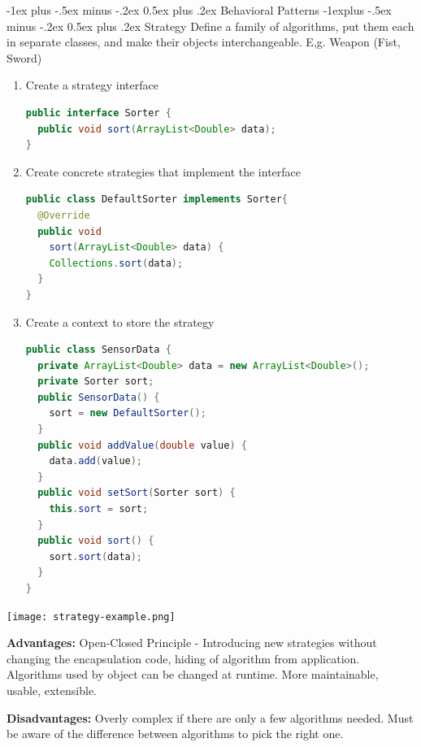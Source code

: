 \documentclass[letterpaper, 8pt]{extarticle}
\makeatletter
\renewcommand{\section}{\@startsection{section}{1}{0mm}%
                                {-1ex plus -.5ex minus -.2ex}%
                                {0.5ex plus .2ex}%
                                {\normalfont\normalsize\bfseries}}
\renewcommand{\subsection}{\@startsection{subsection}{2}{0mm}%
                                {-1explus -.5ex minus -.2ex}%
                                {0.5ex plus .2ex}%
                                {\normalfont\small\bfseries}}
\makeatother
\begin{document}
\begin{multicols*}{5}
  \section{Behavioral Patterns}
  \subsection{Strategy}
  Define a family of algorithms, put them each in separate classes,
  and make their objects interchangeable. E,g. Weapon (Fist, Sword)
  \begin{enumerate}
    \item Create a strategy interface
          \begin{lstlisting}[language=Java, breaklines=true]
public interface Sorter {
  public void sort(ArrayList<Double> data);
}
        \end{lstlisting}
    \item Create concrete strategies that implement the interface
          \begin{lstlisting}[language=Java, breaklines=true]
public class DefaultSorter implements Sorter{
  @Override
  public void
    sort(ArrayList<Double> data) {
    Collections.sort(data);
  }
}
        \end{lstlisting}
    \item Create a context to store the strategy
          \begin{lstlisting}[language=Java, breaklines=true]
public class SensorData {
  private ArrayList<Double> data = new ArrayList<Double>();
  private Sorter sort;
  public SensorData() {
    sort = new DefaultSorter();
  }
  public void addValue(double value) {
    data.add(value);
  }
  public void setSort(Sorter sort) {
    this.sort = sort;
  }
  public void sort() {
    sort.sort(data);
  }
}

        \end{lstlisting}
  \end{enumerate}
  \begin{center}
    \texttt{[image: strategy-example.png]}
  \end{center}

  \textbf{Advantages:}
  Open-Closed Principle - Introducing new strategies without changing the encapsulation code,
  hiding of algorithm from application.
  Algorithms used by object can be changed at runtime.
  More maintainable, usable, extensible.

  \textbf{Disadvantages:}
  Overly complex if there are only a few algorithms needed.
  Must be aware of the difference between algorithms to pick the right one.


\end{multicols*}
\end{document}
